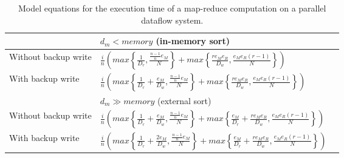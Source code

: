 {
\renewcommand{\baselinestretch}{1.0}
\begin{table*}
\centering
\renewcommand{\arraystretch}{1.2}
\begin{tabular}{|l|l|l|}
\hline
& $d_m < memory$ (in-memory sort) \\ \hline
Without backup write &
$\frac{i}{n} \left( max\left\{\frac{1}{D_r}, \frac{\frac{n-1}{n} e_M}{N}\right\} +
max\left\{\frac{r e_M e_R}{D_w}, \frac{e_M e_R \left(r - 1\right)}{N}\right\} \right)$ \\ \hline
With backup write & $\frac{i}{n} \left( max\left\{\frac{1}{D_r} + \frac{e_M}{D_w},
\frac{\frac{n-1}{n} e_M}{N}\right\} + max\left\{\frac{r e_M e_R}{D_w}, \frac{e_M
e_R \left(r - 1\right)}{N}\right\} \right)$ \\ \hline

& $d_m \gg memory$ (external sort) \\ \hline
Without backup write & $\frac{i}{n} \left( max\left\{\frac{1}{D_r} + \frac{e_M}{D_w},
\frac{\frac{n-1}{n} e_M}{N}\right\} + max\left\{\frac{e_M}{D_r} + \frac{r e_M e_R}{D_w},
\frac{e_M e_R \left(r - 1\right)}{N}\right\} \right)$ \\ \hline
With backup write & $\frac{i}{n} \left(
max\left\{\frac{1}{D_r} + \frac{2 e_M}{D_w}, \frac{\frac{n-1}{n} e_M}{N}\right\} +
max\left\{\frac{e_M}{D_r} + \frac{r e_M e_R}{D_w}, \frac{e_M e_R \left(r -
1\right)}{N}\right\} \right)$ \\ \hline

\end{tabular}
\caption{Model equations for the execution time of a map-reduce computation on a parallel dataflow system.
}
\label{table:model:replication}
\end{table*}
}
